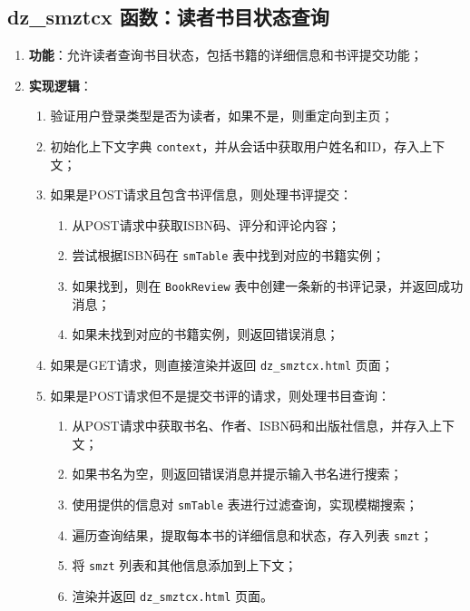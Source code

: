 \documentclass{ctexart}
\begin{document}
\subsection{dz\_smztcx 函数：读者书目状态查询}
\begin{enumerate}
    \item \textbf{功能}：允许读者查询书目状态，包括书籍的详细信息和书评提交功能；
    \item \textbf{实现逻辑}：
    \begin{enumerate}
        \item 验证用户登录类型是否为读者，如果不是，则重定向到主页；
        \item 初始化上下文字典 \texttt{context}，并从会话中获取用户姓名和ID，存入上下文；
        \item 如果是POST请求且包含书评信息，则处理书评提交：
        \begin{enumerate}
            \item 从POST请求中获取ISBN码、评分和评论内容；
            \item 尝试根据ISBN码在 \texttt{smTable} 表中找到对应的书籍实例；
            \item 如果找到，则在 \texttt{BookReview} 表中创建一条新的书评记录，并返回成功消息；
            \item 如果未找到对应的书籍实例，则返回错误消息；
        \end{enumerate}
        \item 如果是GET请求，则直接渲染并返回 \texttt{dz\_smztcx.html} 页面；
        \item 如果是POST请求但不是提交书评的请求，则处理书目查询：
        \begin{enumerate}
            \item 从POST请求中获取书名、作者、ISBN码和出版社信息，并存入上下文；
            \item 如果书名为空，则返回错误消息并提示输入书名进行搜索；
            \item 使用提供的信息对 \texttt{smTable} 表进行过滤查询，实现模糊搜索；
            \item 遍历查询结果，提取每本书的详细信息和状态，存入列表 \texttt{smzt}；
            \item 将 \texttt{smzt} 列表和其他信息添加到上下文；
            \item 渲染并返回 \texttt{dz\_smztcx.html} 页面。
        \end{enumerate}
    \end{enumerate}
\end{enumerate}
\end{document}
